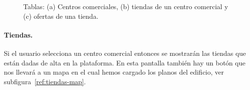 \begin{figure}[tbp]
\caption{Tablas: (a) Centros comerciales, (b) tiendas de un centro comercial y (c) ofertas de una tienda.}
\end{figure}

\paragraph{Tiendas.} Si el usuario selecciona un centro comercial entonces se mostrarán las tiendas que están dadas de alta en la plataforma. En esta pantalla también hay un botón que nos llevará a un mapa en el cual hemos cargado los planos del edificio, ver subfigura~\ref{ref:tiendas-map}.

